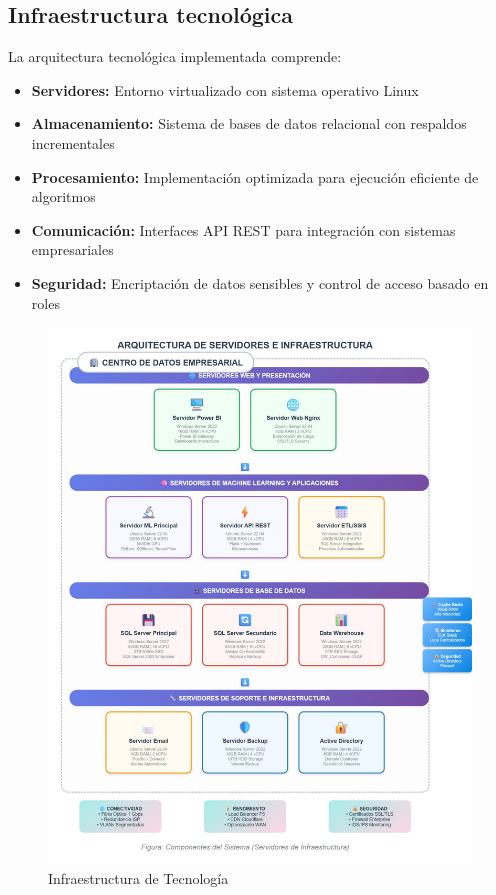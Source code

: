 \subsection{Infraestructura tecnológica}
La arquitectura tecnológica implementada comprende:
   
\begin{itemize}
    \item \textbf{Servidores:} Entorno virtualizado con sistema operativo Linux
    \item \textbf{Almacenamiento:} Sistema de bases de datos relacional con respaldos incrementales
    \item \textbf{Procesamiento:} Implementación optimizada para ejecución eficiente de algoritmos
    \item \textbf{Comunicación:} Interfaces API REST para integración con sistemas empresariales
    \item \textbf{Seguridad:} Encriptación de datos sensibles y control de acceso basado en roles

\end{itemize}

    \vfill
    \begin{figure}
    \centering    \includegraphics[width=1\textwidth,height=1\textheight,keepaspectratio]{Arquitectura de Servidores.pdf}
    \caption{Infraestructura de Tecnología}
    \label{fig:enter-label}
    \end{figure}
    \vfill
    \newpage

